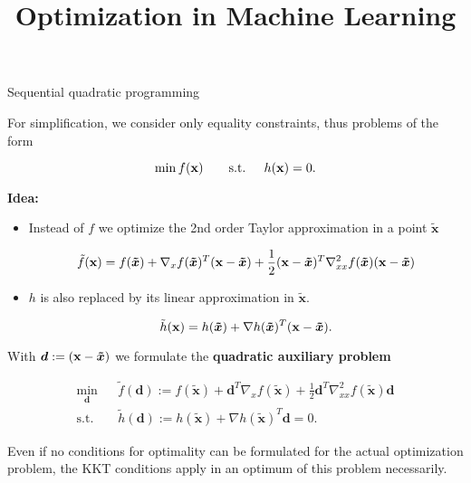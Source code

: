 \documentclass[11pt,compress,t,notes=noshow, xcolor=table]{beamer}
\title{Optimization in Machine Learning}
\begin{document}


\begin{vbframe}{Sequential quadratic programming}

For simplification, we consider only equality constraints, thus problems of the form

$$
\min f(\mathbf{x}) \qquad \text{s.t. } \quad h(\mathbf{x}) = 0.
$$

\textbf{Idea:}

\begin{itemize}
\item Instead of $f$ we optimize the 2nd order Taylor approximation in a point $\bm{\tilde x}$

$$
\tilde f(\mathbf{x}) = f(\bm{\tilde x}) +  \nabla_{x} f(\bm{\tilde x})^T (\mathbf{x}- \bm{\tilde x})+ \frac{1}{2} (\mathbf{x}- \bm{\tilde x})^T \nabla^2_{xx} f(\bm{\tilde x}) (\mathbf{x}- \bm{\tilde x})
$$

\item $h$ is also replaced by its linear approximation in $\bm{\tilde x}$.

$$
\tilde h(\mathbf{x}) = h(\bm{\tilde x}) + \nabla h(\bm{\tilde x})^T(\mathbf{x}- \bm{\tilde x}).
$$
\end{itemize}

\framebreak

With $\bm{d} := (\mathbf{x}- \bm{\tilde x})$ we formulate the \textbf{quadratic auxiliary problem}

\begin{eqnarray*}
\min_{\bm{d}} && \tilde f(\bm{d}) := f(\bm{\tilde x}) + \bm{d}^T \nabla_{x} f(\bm{\tilde x}) + \frac{1}{2} \bm{d}^T \nabla^2_{xx} f(\bm{\tilde x}) \bm{d} \\
\text{s.t. } && \tilde h(\bm{d}) :=  h(\bm{\tilde x}) + \nabla h(\bm{\tilde x})^T\bm{d} = 0.
\end{eqnarray*}

Even if no conditions for optimality can be formulated for the actual optimization problem, the KKT conditions apply in an optimum of this problem necessarily.


\end{vbframe}
\end{document}
